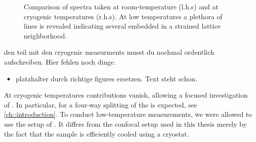 			\begin{figure}[htp]
				\begin{subfigure}[t]{ 0.49\linewidth}
					\centering
					\caption{}
					\label{subfig::roomtep1}
				\end{subfigure}
				\hfill
				\begin{subfigure}[t]{ 0.49\linewidth}
					\centering
					\caption{}
					\label{subfig::cryo}
				\end{subfigure}
				\hfill
				\begin{subfigure}[t]{ 0.49\linewidth}
					\centering
					\caption{}
					\label{subfig::roomtep2}
				\end{subfigure}
				\hfill
				\begin{subfigure}[t]{ 0.49\linewidth}
					\centering
					\caption{}
					\label{subfig::cryo2}
				\end{subfigure}
				\caption[Spectra of \nds at cryogenic temperatures]{Comparison of spectra taken at room-temperature (l.h.s) and at cryogenic temperatures (r.h.s). At low temperatures a plethora of lines is revealed indicating several \sivs embedded in a strained lattice neighborhood.}
				\label{fig::rt_vs_cryo}
			\end{figure}

			\begin{remark}

				den teil mit den cryogenic measurments musst du nochmal ordentlich aufschreiben. Hier fehlen noch dinge.

				\begin{itemize}
					\item platzhalter durch richtige figures ersetzen. Text steht schon.
				\end{itemize}
			\end{remark}

			At cryogenic temperatures \psb contributions vanish, allowing a focused investigation of \zpls. In particular, for \sivs a four-way splitting of the \zpl is expected, see \autoref{ch::introduction}. To conduct low-temperature measurements, we were allowed to use the setup of \becker. It differs from the confocal setup used in this thesis merely by the fact that the sample is efficiently cooled using a cryostat.

